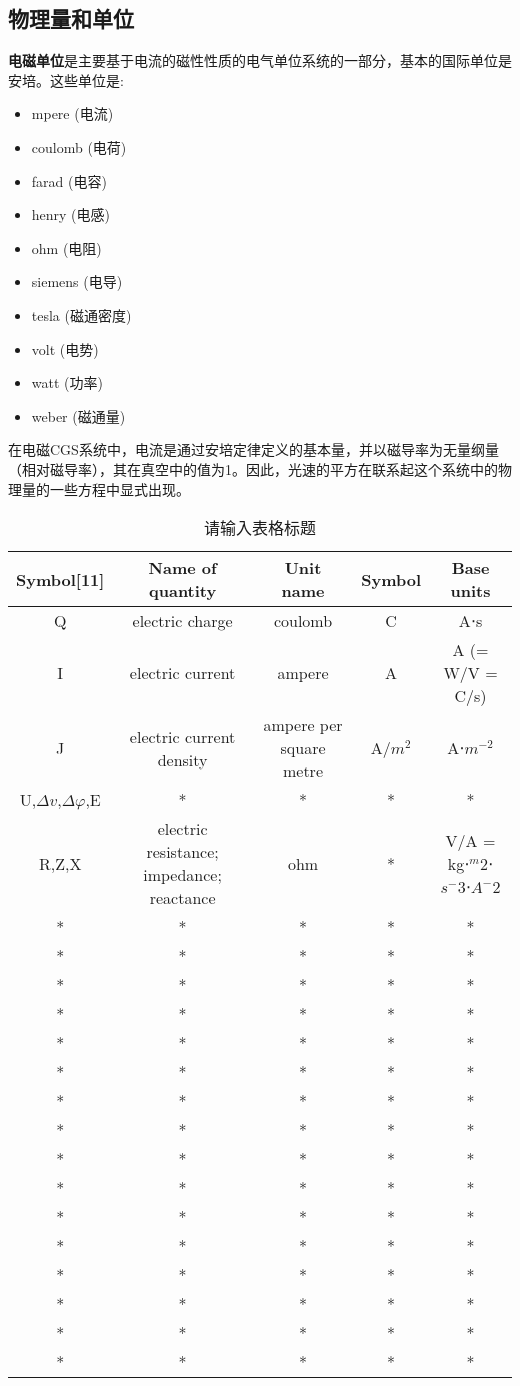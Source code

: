 \subsection{ 物理量和单位}
\textbf{电磁单位}是主要基于电流的磁性性质的电气单位系统的一部分，基本的国际单位是安培。这些单位是:
\begin{itemize}
\item mpere (电流)
\item coulomb (电荷)
\item farad (电容)
\item henry (电感)
\item ohm (电阻)
\item siemens (电导)
\item tesla (磁通密度)
\item volt (电势)
\item watt (功率)
\item weber (磁通量)
\end{itemize}
在电磁CGS系统中，电流是通过安培定律定义的基本量，并以磁导率为无量纲量（相对磁导率），其在真空中的值为1。因此，光速的平方在联系起这个系统中的物理量的一些方程中显式出现。
\begin{table}[ht]
\centering
\caption{请输入表格标题}\label{tab_DCXHZY1}
\begin{tabular}{|c|c|c|c|c|}
\hline
Symbol[11]& Name of quantity & Unit name & Symbol & Base units\\
\hline
Q & electric charge& coulomb & 	C &A⋅s \\
\hline
I & electric current & ampere & A & A (= W/V = C/s)\\
\hline
J & electric current density & ampere per square metre& A/$m^2$ &A⋅$m^{-2}$ \\
\hline
U,$\Delta v$,$\Delta \varphi$,E& * & * & * & * \\
\hline
R,Z,X & electric resistance; impedance; reactance & ohm & * & V/A = kg⋅$^m2$⋅$s^-3$⋅$A^-2$ \\
\hline
* & * & * & * & * \\
\hline
* & * & * & * & * \\
\hline
* & * & * & * & * \\
\hline
* & * & * & * & * \\
\hline
* & * & * & * & * \\
\hline
* & * & * & * & * \\
\hline
* & * & * & * & * \\
\hline
* & * & * & * & * \\
\hline
* & * & * & * & * \\
\hline
* & * & * & * & * \\
\hline
* & * & * & * & * \\
\hline
* & * & * & * & * \\
\hline
* & * & * & * & * \\
\hline
* & * & * & * & * \\
\hline
* & * & * & * & * \\
\hline
* & * & * & * & * \\
\hline
\end{tabular}
\end{table}